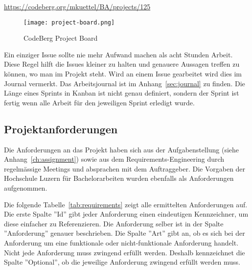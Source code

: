 \url{https://codeberg.org/mkuettel/BA/projects/125}

\begin{figure*}[ht]
    \texttt{[image: project-board.png]}
    \caption{CodeBerg Project Board}
    \label{fig:projectboard}
\end{figure*}


Ein einziger Issue sollte nie mehr Aufwand machen als acht Stunden Arbeit. Diese Regel hilft die Issues kleiner zu halten und genauere Aussagen treffen zu können, wo man im Projekt steht.
Wird an einem Issue gearbeitet wird dies im Journal vermerkt.
Das Arbeitsjournal ist im Anhang~\ref{sec:journal} zu finden.
Die Länge eines Sprints in Kanban ist nicht genau definiert, sondern der Sprint ist fertig wenn alle Arbeit für den jeweiligen Sprint erledigt wurde.

\subsection{Projektanforderungen}
\label{sub:Anforderungen}

Die Anforderungen an das Projekt haben sich aus der Aufgabenstellung (siehe Anhang~\ref{ch:assignment}) sowie aus dem Requirements-Engineering durch regelmässige Meetings und absprachen mit dem Auftraggeber. Die Vorgaben der Hochschule Luzern für Bachelorarbeiten wurden ebenfalls als Anforderungen aufgenommen.

Die folgende Tabelle~\ref{tab:requirements} zeigt alle ermittelten Anforderungen auf.
Die erste Spalte ''Id'' gibt jeder Anforderung einen eindeutigen Kennzeichner, um diese einfacher zu Referenzieren.
Die Anforderung selber ist in der Spalte ''Anforderung'' genauer beschrieben.
Die Spalte ''Art'' gibt an, ob es sich bei der Anforderung um eine funktionale oder nicht-funktionale Anforderung handelt.
Nicht jede Anforderung muss zwingend erfüllt werden. Deshalb kennzeichnet die Spalte ''Optional'', ob die jeweilige Anforderung zwingend erfüllt werden muss.

